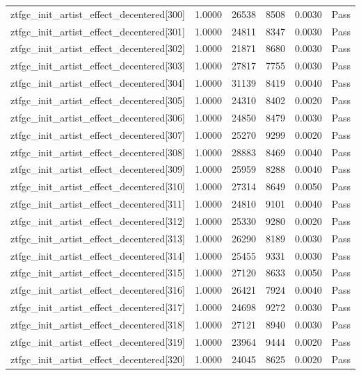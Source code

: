 \begin{table}[htbp]
\begin{tabular}{llrrll}
ztfgc\_init\_artist\_effect\_decentered[300] & 1.0000 & 26538 & 8508 & 0.0030 & Pass \\
ztfgc\_init\_artist\_effect\_decentered[301] & 1.0000 & 24811 & 8347 & 0.0030 & Pass \\
ztfgc\_init\_artist\_effect\_decentered[302] & 1.0000 & 21871 & 8680 & 0.0030 & Pass \\
ztfgc\_init\_artist\_effect\_decentered[303] & 1.0000 & 27817 & 7755 & 0.0030 & Pass \\
ztfgc\_init\_artist\_effect\_decentered[304] & 1.0000 & 31139 & 8419 & 0.0040 & Pass \\
ztfgc\_init\_artist\_effect\_decentered[305] & 1.0000 & 24310 & 8402 & 0.0020 & Pass \\
ztfgc\_init\_artist\_effect\_decentered[306] & 1.0000 & 24850 & 8479 & 0.0030 & Pass \\
ztfgc\_init\_artist\_effect\_decentered[307] & 1.0000 & 25270 & 9299 & 0.0020 & Pass \\
ztfgc\_init\_artist\_effect\_decentered[308] & 1.0000 & 28883 & 8469 & 0.0040 & Pass \\
ztfgc\_init\_artist\_effect\_decentered[309] & 1.0000 & 25959 & 8288 & 0.0040 & Pass \\
ztfgc\_init\_artist\_effect\_decentered[310] & 1.0000 & 27314 & 8649 & 0.0050 & Pass \\
ztfgc\_init\_artist\_effect\_decentered[311] & 1.0000 & 24810 & 9101 & 0.0040 & Pass \\
ztfgc\_init\_artist\_effect\_decentered[312] & 1.0000 & 25330 & 9280 & 0.0020 & Pass \\
ztfgc\_init\_artist\_effect\_decentered[313] & 1.0000 & 26290 & 8189 & 0.0030 & Pass \\
ztfgc\_init\_artist\_effect\_decentered[314] & 1.0000 & 25455 & 9331 & 0.0030 & Pass \\
ztfgc\_init\_artist\_effect\_decentered[315] & 1.0000 & 27120 & 8633 & 0.0050 & Pass \\
ztfgc\_init\_artist\_effect\_decentered[316] & 1.0000 & 26421 & 7924 & 0.0040 & Pass \\
ztfgc\_init\_artist\_effect\_decentered[317] & 1.0000 & 24698 & 9272 & 0.0030 & Pass \\
ztfgc\_init\_artist\_effect\_decentered[318] & 1.0000 & 27121 & 8940 & 0.0030 & Pass \\
ztfgc\_init\_artist\_effect\_decentered[319] & 1.0000 & 23964 & 9444 & 0.0020 & Pass \\
ztfgc\_init\_artist\_effect\_decentered[320] & 1.0000 & 24045 & 8625 & 0.0020 & Pass \\

\end{tabular}
\end{table}
